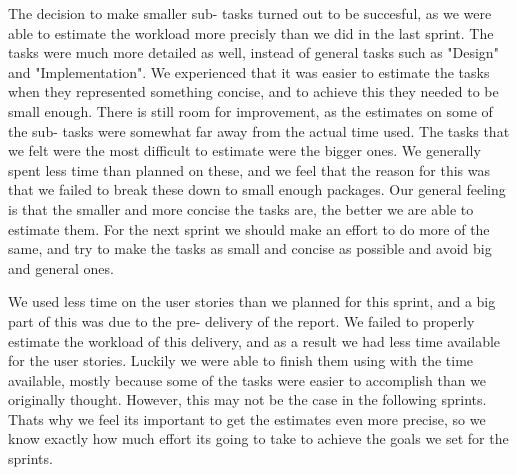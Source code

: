 The decision to make smaller sub- tasks turned out to be succesful, as we were able to estimate the workload more precisly than we did in the last sprint. The tasks were much more detailed as well, instead of general tasks such as "Design" and "Implementation". We experienced that it was easier to estimate the tasks when they represented something concise, and to achieve this they needed to be small enough. There is still room for improvement, as the estimates on some of the sub- tasks were somewhat far away from the actual time used. The tasks that we felt were the most difficult to estimate were the bigger ones. We generally spent less time than planned on these, and we feel that the reason for this was that we failed to break these down to small enough packages. Our general feeling is that the smaller and more concise the tasks are, the better we are able to estimate them. For the next sprint we should make an effort to do more of the same, and try to make the tasks as small and concise as possible and avoid big and general ones.

We used less time on the user stories than we planned for this sprint, and a big part of this was due to the pre- delivery of the report. We failed to properly estimate the workload of this delivery, and as a result we had less time available for the user stories. Luckily we were able to finish them using with the time available, mostly because some of the tasks were easier to accomplish than we originally thought. However, this may not be the case in the following sprints. Thats why we feel its important to get the estimates even more precise, so we know exactly how much effort its going to take to achieve the goals we set for the sprints. 

